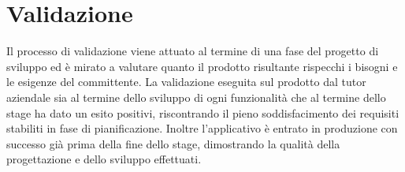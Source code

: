 \section{Validazione}
Il processo di validazione viene attuato al termine di una fase del progetto di sviluppo ed è mirato a valutare quanto il prodotto risultante rispecchi i bisogni e le esigenze del committente. La validazione eseguita sul prodotto dal tutor aziendale sia al termine dello sviluppo di ogni funzionalità che al termine dello stage ha dato un esito positivi, riscontrando il pieno soddisfacimento dei requisiti stabiliti in fase di pianificazione. Inoltre l'applicativo è entrato in produzione con successo già prima della fine dello stage, dimostrando la qualità della progettazione e dello sviluppo effettuati.

